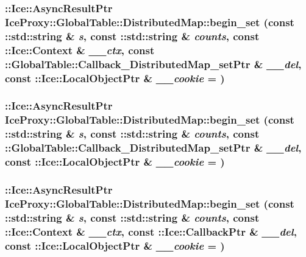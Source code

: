 \label{class_ice_proxy_1_1_global_table_1_1_distributed_map_ae2df6dc016871497c81bd0949a3ea037}
\hypertarget{class_ice_proxy_1_1_global_table_1_1_distributed_map_a5df6c6297880fcc72e1bf22ed9e5c5d7}{
\subsubsection[{begin\_\-set}]{\setlength{\rightskip}{0pt plus 5cm}::Ice::AsyncResultPtr IceProxy::GlobalTable::DistributedMap::begin\_\-set (const ::std::string \& {\em s}, \/  const ::std::string \& {\em counts}, \/  const ::Ice::Context \& {\em \_\-\_\-ctx}, \/  const ::{\bf GlobalTable::Callback\_\-DistributedMap\_\-setPtr} \& {\em \_\-\_\-del}, \/  const ::Ice::LocalObjectPtr \& {\em \_\-\_\-cookie} = {})}}
\label{class_ice_proxy_1_1_global_table_1_1_distributed_map_a5df6c6297880fcc72e1bf22ed9e5c5d7}
\hypertarget{class_ice_proxy_1_1_global_table_1_1_distributed_map_a87695c97a97a3ed2d436d81da7452006}{
\subsubsection[{begin\_\-set}]{\setlength{\rightskip}{0pt plus 5cm}::Ice::AsyncResultPtr IceProxy::GlobalTable::DistributedMap::begin\_\-set (const ::std::string \& {\em s}, \/  const ::std::string \& {\em counts}, \/  const ::{\bf GlobalTable::Callback\_\-DistributedMap\_\-setPtr} \& {\em \_\-\_\-del}, \/  const ::Ice::LocalObjectPtr \& {\em \_\-\_\-cookie} = {})}}
\label{class_ice_proxy_1_1_global_table_1_1_distributed_map_a87695c97a97a3ed2d436d81da7452006}
\hypertarget{class_ice_proxy_1_1_global_table_1_1_distributed_map_ab88395a8799499c022f1edc1ac499de3}{
\subsubsection[{begin\_\-set}]{\setlength{\rightskip}{0pt plus 5cm}::Ice::AsyncResultPtr IceProxy::GlobalTable::DistributedMap::begin\_\-set (const ::std::string \& {\em s}, \/  const ::std::string \& {\em counts}, \/  const ::Ice::Context \& {\em \_\-\_\-ctx}, \/  const ::Ice::CallbackPtr \& {\em \_\-\_\-del}, \/  const ::Ice::LocalObjectPtr \& {\em \_\-\_\-cookie} = {})}}
